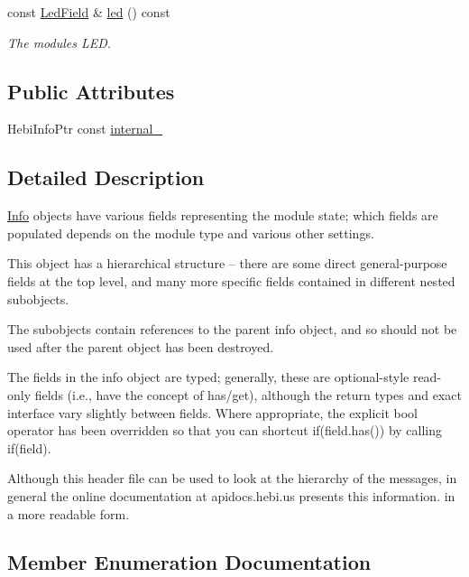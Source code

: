 \begin{DoxyCompactItemize}
\mbox{\label{classhebi_1_1Info_a29e1ba4a000aaca0892de21018bee714}} 
const \hyperlink{classhebi_1_1Info_1_1LedField}{Led\+Field} \& \hyperlink{classhebi_1_1Info_a29e1ba4a000aaca0892de21018bee714}{led} () const
\begin{DoxyCompactList}\small\item\em The module\textquotesingle{}s L\+ED. \end{DoxyCompactList}\end{DoxyCompactItemize}
\subsection*{Public Attributes}
\begin{DoxyCompactItemize}
\item 
Hebi\+Info\+Ptr const \hyperlink{classhebi_1_1Info_aedc02a37757c7fcbd53a8069eeffcc73}{internal\+\_\+}
\end{DoxyCompactItemize}


\subsection{Detailed Description}
\hyperlink{classhebi_1_1Info}{Info} objects have various fields representing the module state; which fields are populated depends on the module type and various other settings. 

This object has a hierarchical structure -- there are some direct general-\/purpose fields at the top level, and many more specific fields contained in different nested subobjects.

The subobjects contain references to the parent info object, and so should not be used after the parent object has been destroyed.

The fields in the info object are typed; generally, these are optional-\/style read-\/only fields (i.\+e., have the concept of has/get), although the return types and exact interface vary slightly between fields. Where appropriate, the explicit bool operator has been overridden so that you can shortcut {\ttfamily if}(field.\+has()) by calling {\ttfamily if(field)}.

Although this header file can be used to look at the hierarchy of the messages, in general the online documentation at apidocs.\+hebi.\+us presents this information. in a more readable form. 

\subsection{Member Enumeration Documentation}
\mbox{\label{classhebi_1_1Info_a154026587295ad17a3e1460f32dab668}} 
